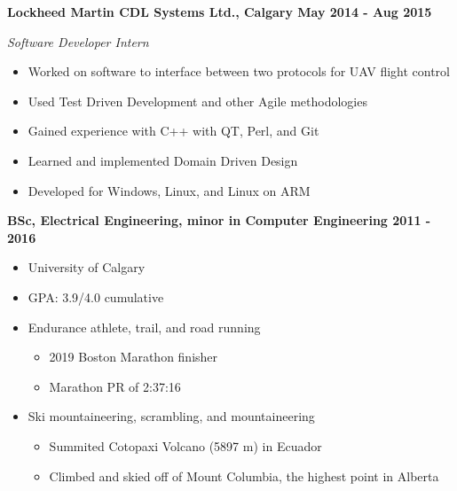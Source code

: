 \documentclass[12pt]{article}
\begin{document}
\noindent \centerline{ \bf Lockheed Martin CDL Systems Ltd., Calgary \hfill May 2014 - Aug 2015}
\indent \emph{ Software Developer Intern }
\begin{itemize}
  \item Worked on software to interface between two protocols for UAV flight control
  \item Used Test Driven Development and other Agile methodologies
  \item Gained experience with C++ with QT, Perl, and Git
  \item Learned and implemented Domain Driven Design
  \item Developed for Windows, Linux, and Linux on ARM
\end{itemize}
\medskip

\bigskip
{}
\medskip

\noindent \centerline{ \bf BSc, Electrical Engineering, minor in Computer Engineering  \hfill 2011 - 2016}
\begin{itemize}[parsep=0pt,partopsep=0pt]
  \item University of Calgary
  \item GPA: 3.9/4.0 cumulative
\end{itemize}

\bigskip
{}
\medskip

\begin{itemize}
\item Endurance athlete, trail, and road running
  \begin{itemize}
    \item 2019 Boston Marathon finisher
    \item Marathon PR of 2:37:16
  \end{itemize}
\item Ski mountaineering, scrambling, and mountaineering
  \begin{itemize}
    \item Summited Cotopaxi Volcano (5897 m) in Ecuador
    \item Climbed and skied off of Mount Columbia, the highest point in Alberta
  \end{itemize}
\end{itemize}
\end{document}
